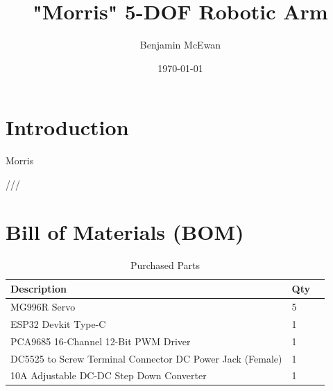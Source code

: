 \documentclass[a4paper,11pt]{article}
\begin{document}
\title{\textbf{"Morris" 5-DOF Robotic Arm}}
\author{Benjamin McEwan}
\date{\today}
\maketitle

\tableofcontents


\newpage
\section{Introduction}
%      

Morris 

%     

///

\newpage
\section{Bill of Materials (BOM)}
\begin{table}[H]
    \centering
    \caption{Purchased Parts}
    \label{tab:bom_pp}
    \begin{tabularx}{\textwidth}{@{} l X r @{}}
        \toprule
        \textbf{Description} & \textbf{Qty} \\
        \midrule
        MG996R Servo                                              & 5 \\
        ESP32 Devkit Type-C                                       & 1 \\
        PCA9685 16-Channel 12-Bit PWM Driver                      & 1 \\
        DC5525 to Screw Terminal Connector DC Power Jack (Female) & 1 \\
        10A Adjustable DC-DC Step Down Converter                  & 1 \\
        \bottomrule
    \end{tabularx}
\end{table}
\end{document}
